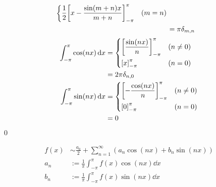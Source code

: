 \documentclass[uplatex,dvipdfmx,a4paper,11pt]{jlreq}
\makeatletter
\theoremstyle{definition}
\renewenvironment{proof}[1][\proofname]{\par
  \normalfont
  \topsep6\p@\@plus6\p@ \trivlist
  \item[\hskip\labelsep{\bfseries #1}\@addpunct{\bfseries}]\ignorespaces\quad\par
}{%
  \qed\endtrivlist\@endpefalse
}
\renewcommand\proofname{証明}
\makeatother
\begin{document}
\begin{proof}
\begin{align}
\begin{dcases}
                                                 \frac{1}{2}\qty[x - \frac{\sin(m + n)x}{m + n}]_{-\pi}^\pi                          & (m = n)
                                               \end{dcases} \\
                                           & = \pi\delta_{m,n}
  \end{align}
  \begin{align}
    \int_{-\pi}^\pi \cos(nx)\dd{x} & = \begin{dcases}
                                         \qty[\frac{\sin(nx)}{n}]_{-\pi}^\pi & (n \neq 0) \\
                                         \qty[x]_{-\pi}^\pi                  & (n = 0)
                                       \end{dcases}  \\
                                   & = 2\pi\delta_{n,0}                                      \\
    \int_{-\pi}^\pi \sin(nx)\dd{x} & = \begin{dcases}
                                         \qty[-\frac{\cos(nx)}{n}]_{-\pi}^\pi & (n \neq 0) \\
                                         \qty[0]_{-\pi}^\pi                   & (n = 0)
                                       \end{dcases} \\
                                   & = 0
  \end{align}
\end{proof}

\begin{definition}[$2\pi$ の周期をもつ関数のフーリエ級数]
  \begin{align}
    f(x) & \sim \frac{a_0}{2} + \sum_{n=1}^{\infty}(a_n\cos(nx) + b_n\sin(nx)) \\
    a_n  & := \frac{1}{\pi}\int_{-\pi}^\pi f(x)\cos(nx)\dd{x}                  \\
    b_n  & := \frac{1}{\pi}\int_{-\pi}^\pi f(x)\sin(nx)\dd{x}
  \end{align}
\end{definition}
\end{document}
